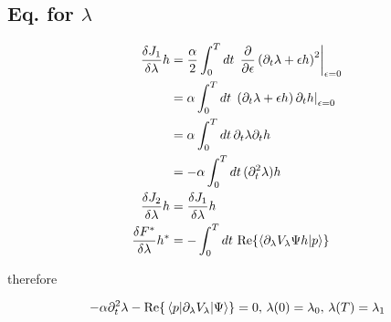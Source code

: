 \documentclass[10pt,a4paper]{article}
\newcommand{\intT}{\ensuremath{\int_0^T dt\,}}
\begin{document}
\subsection{Eq. for $\lambda$}

\begin{align}
\fdv{J_1}{\lambda} h &= \frac{\alpha}{2} \intT \left. \pdv{\epsilon} \left( \partial_t \lambda + \epsilon h \right)^2 \right\vert_{\epsilon=0} \\ 
&= \alpha \intT \left. \left( \partial_t \lambda + \epsilon h \right) \partial_t h \right\vert_{\epsilon=0} \\
&= \alpha \intT \partial_t \lambda \partial_t h \\ 
&= -\alpha \intT (\partial_t^2 \lambda ) h\\
\fdv{J_2}{\lambda} h &= \fdv{J_1}{\lambda} h\\
\fdv{F^*}{\lambda} h^* &= -\intT \Re{\braket{\partial_{\lambda} V_{\lambda} \Psi h}{p}}
\end{align}

therefore 

\begin{equation}
-\alpha \partial_t^2 \lambda - \Re{\mel{p}{\partial_{\lambda} V_{\lambda}}{\Psi}} = 0, \, \lambda(0)=\lambda_0, \, \lambda(T)=\lambda_1
\end{equation}
\end{document}
